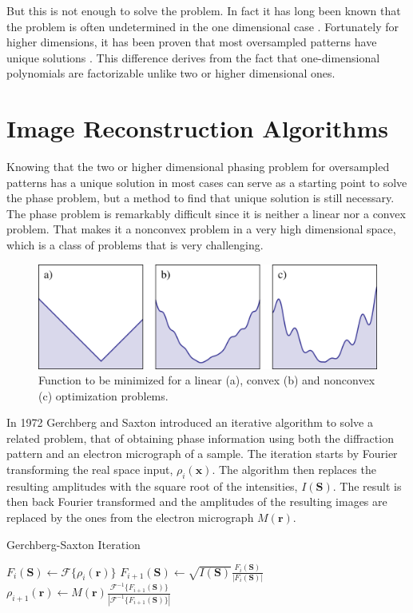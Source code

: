 But this is not enough to solve the problem. In fact it
has long been known that the problem is often undetermined in the one dimensional case
\cite{Walther1963Question}. Fortunately for higher dimensions, it has
been proven that most oversampled patterns have unique solutions
\cite{Bruck1979Ambiguity}. This difference derives from the fact that one-dimensional
polynomials are factorizable unlike two or higher dimensional ones.

\section{Image Reconstruction Algorithms}

Knowing that the two or higher dimensional phasing problem for oversampled
patterns has a unique solution in most cases can serve as a starting point to
solve the phase problem, but a method to find that unique solution is still
necessary. The phase problem is remarkably difficult since it is neither a
linear nor a convex problem. That makes it a nonconvex problem in a very high
dimensional space, which is a class of problems that is very challenging.

\begin{figure}[h]
  \centering
  \includegraphics[width=1 \columnwidth]{Image_Reconstruction/convexity.png}
  \caption{Function to be minimized for a linear (a), convex (b) and nonconvex
    (c) optimization problems.}
  \label{Fig:Convexity}
\end{figure}

In 1972 Gerchberg and Saxton \cite{Gerchberg1972Practical} introduced an iterative algorithm to solve
a related problem, that of obtaining phase information using both the
diffraction pattern and an electron micrograph of a sample. The iteration starts
by Fourier transforming the real space input, $\rho_i(\mathbf x)$. The algorithm
then replaces the resulting amplitudes with the square root of the intensities,
$I(\mathbf S)$. The result is then back Fourier transformed and the amplitudes
of the resulting images are replaced by the ones from the electron micrograph $M(\mathbf r)$.
\begin{algorithm}
\caption{Gerchberg-Saxton Iteration}
\begin{algorithmic}
  \STATE $F_{i}(\mathbf S) \gets \mathscr{F}\{\rho_i(\mathbf r)\}$
  \STATE $F_{i+1}(\mathbf S) \gets \sqrt{I(\mathbf S)} \frac{F_i(\mathbf S)}{|F_i(\mathbf S)|}$
  \STATE $\rho_{i+1}(\mathbf r) \gets M(\mathbf r)
  \frac{\mathscr{F}^{-1}\{F_{i+1}(\mathbf
    S)\}}{|\mathscr{F}^{-1}\{F_{i+1}(\mathbf S)\}|}$
\end{algorithmic}
\end{algorithm}

